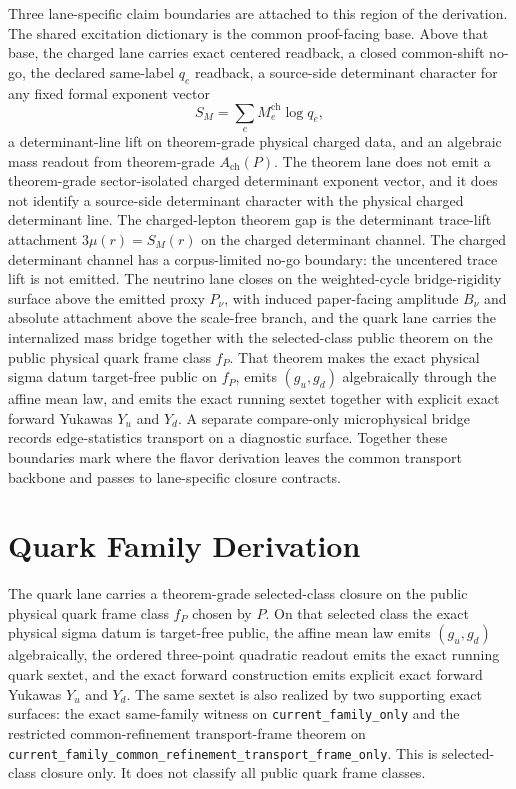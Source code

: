 \documentclass[11pt]{article}
\begin{document}
Three lane-specific claim boundaries are attached to this region of the derivation. The shared
excitation dictionary is the common proof-facing base. Above that base, the charged lane carries
exact centered readback, a closed common-shift no-go, the declared same-label \(q_e\) readback, a
source-side determinant character for any fixed formal exponent vector
\[
S_M=\sum_e M_e^{\mathrm{ch}}\log q_e,
\]
a determinant-line lift on theorem-grade physical charged data, and an algebraic mass
readout from theorem-grade \(A_{\mathrm{ch}}(P)\). The theorem lane does not emit a theorem-grade
sector-isolated charged determinant exponent vector, and it does not identify a source-side
determinant character with the physical charged determinant line. The charged-lepton theorem gap is the
determinant trace-lift attachment \(3\mu(r)=S_M(r)\) on the charged determinant channel. The charged determinant channel has a corpus-limited no-go boundary: the uncentered trace lift is not emitted. The neutrino lane closes on the weighted-cycle
bridge-rigidity surface above the emitted proxy \(P_\nu\), with induced paper-facing amplitude \(B_\nu\) and absolute attachment above the scale-free branch, and the quark
lane carries the internalized mass bridge together with the selected-class public theorem on the
public physical quark frame class \(f_P\). That theorem makes the exact physical sigma datum
target-free public on \(f_P\), emits \((g_u,g_d)\) algebraically through the affine mean law,
and emits the exact running sextet together with explicit exact forward Yukawas \(Y_u\) and
\(Y_d\). A separate compare-only microphysical bridge records edge-statistics transport on a
diagnostic surface. Together these boundaries mark where the flavor
derivation leaves the common transport backbone and passes to lane-specific closure contracts.

\section{Quark Family Derivation}

The quark lane carries a theorem-grade selected-class closure on the public physical quark frame
class \(f_P\) chosen by \(P\). On that selected class the exact physical sigma datum is
target-free public, the affine mean law emits \((g_u,g_d)\) algebraically, the ordered
three-point quadratic readout emits the exact running quark sextet, and the exact forward
construction emits explicit exact forward Yukawas \(Y_u\) and \(Y_d\). The same sextet is also
realized by two supporting exact surfaces: the exact same-family witness on
\texttt{current\_family\_only} and the restricted common-refinement
transport-frame theorem on
\texttt{current\_family\_common\_refinement\_transport\_frame\_only}. This is selected-class
closure only. It does not classify all public quark frame classes.
\end{document}

